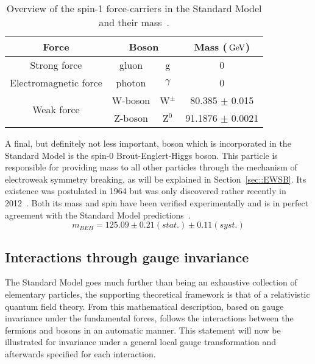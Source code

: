 \begin{table}[h!t]
 \centering
 \caption{Overview of the spin-1 force-carriers in the Standard Model and their mass~\cite{PDGReview}.} \label{table::ForceCarriers}
 \begin{tabular}{|c|cc|c|}%
  \hline
  \textbf{Force} 		&\multicolumn{2}{c|}{\textbf{Boson}} 	& \textbf{Mass ($\, \mathrm{GeV}$)}	\\ %
  \hline
  Strong force 			& gluon 	& g 			& 0 				\\ %
  \hline
  Electromagnetic force		& photon 	& $\gamma$ 		& 0 				\\ %
  \hline
  \multirow{2}{*}{Weak force} 	& W-boson 	& W$^{\pm}$ 		& 80.385 $\pm$ 0.015		\\ %
				& Z-boson 	& Z$^{0}$ 		& 91.1876 $\pm$ 0.0021		\\ %
  \hline
 \end{tabular}
\end{table}

A final, but definitely not less important, boson which is incorporated in the Standard Model is the spin-0 Brout-Englert-Higgs boson. This particle is responsible for providing mass to all other particles through the mechanism of electroweak symmetry breaking, as will be explained in Section~\ref{sec::EWSB}. Its existence was postulated in 1964 but was only discovered rather recently in 2012~\cite{HiggsDiscCMS, HiggsDiscAtlas}. Both its mass and spin have been verified experimentally and is in perfect agreement with the Standard Model predictions~\cite{HiggsMass, HiggsSpin}.
\begin{equation}
 m_{BEH} = 125.09 \pm 0.21 (stat.) \pm 0.11 (syst.)
\end{equation}

\subsection{Interactions through gauge invariance}
The Standard Model goes much further than being an exhaustive collection of elementary particles, the supporting theoretical framework is that of a relativistic quantum field theory.
From this mathematical description, based on gauge invariance under the fundamental forces, follows the interactions between the fermions and bosons in an automatic manner.
This statement will now be illustrated for invariance under a general local gauge transformation and afterwards specified for each interaction.
\\

